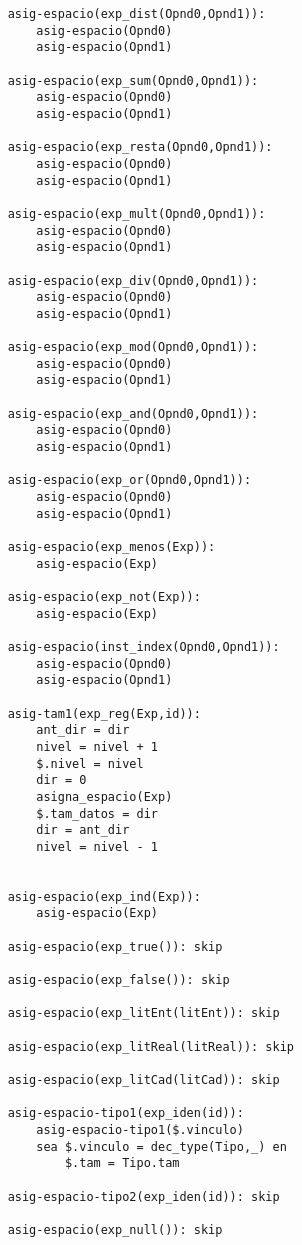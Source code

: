 \begin{lstlisting}
    asig-espacio(exp_dist(Opnd0,Opnd1)):
        asig-espacio(Opnd0)
        asig-espacio(Opnd1)

    asig-espacio(exp_sum(Opnd0,Opnd1)):
        asig-espacio(Opnd0)
        asig-espacio(Opnd1)

    asig-espacio(exp_resta(Opnd0,Opnd1)):
        asig-espacio(Opnd0)
        asig-espacio(Opnd1)

    asig-espacio(exp_mult(Opnd0,Opnd1)):
        asig-espacio(Opnd0)
        asig-espacio(Opnd1)

    asig-espacio(exp_div(Opnd0,Opnd1)):
        asig-espacio(Opnd0)
        asig-espacio(Opnd1)

    asig-espacio(exp_mod(Opnd0,Opnd1)):
        asig-espacio(Opnd0)
        asig-espacio(Opnd1)

    asig-espacio(exp_and(Opnd0,Opnd1)):
        asig-espacio(Opnd0)
        asig-espacio(Opnd1)

    asig-espacio(exp_or(Opnd0,Opnd1)):
        asig-espacio(Opnd0)
        asig-espacio(Opnd1)

    asig-espacio(exp_menos(Exp)):
        asig-espacio(Exp)

    asig-espacio(exp_not(Exp)):
        asig-espacio(Exp)

    asig-espacio(inst_index(Opnd0,Opnd1)):
        asig-espacio(Opnd0)
        asig-espacio(Opnd1)

    asig-tam1(exp_reg(Exp,id)):
        ant_dir = dir 
        nivel = nivel + 1
        $.nivel = nivel
        dir = 0 
        asigna_espacio(Exp)
        $.tam_datos = dir 
        dir = ant_dir 
        nivel = nivel - 1 
       

    asig-espacio(exp_ind(Exp)):
        asig-espacio(Exp)

    asig-espacio(exp_true()): skip

    asig-espacio(exp_false()): skip

    asig-espacio(exp_litEnt(litEnt)): skip

    asig-espacio(exp_litReal(litReal)): skip

    asig-espacio(exp_litCad(litCad)): skip

    asig-espacio-tipo1(exp_iden(id)):
        asig-espacio-tipo1($.vinculo)
        sea $.vinculo = dec_type(Tipo,_) en
            $.tam = Tipo.tam
            
    asig-espacio-tipo2(exp_iden(id)): skip

    asig-espacio(exp_null()): skip


\end{lstlisting}